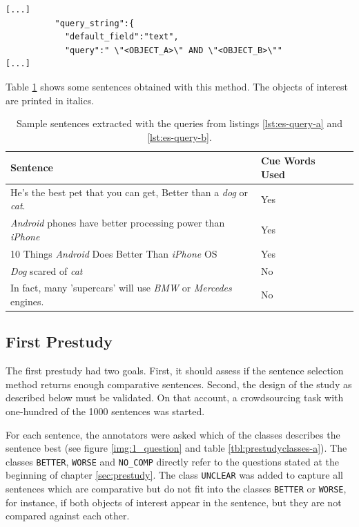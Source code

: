 \begin{lstlisting}[label=lst:es-query-b,breaklines=true,postbreak=\mbox{\textcolor{red}{$\hookrightarrow$}\space},caption=Second query for the prestudy (shortened). This query does not search for the cue words.]
[...]
          "query_string":{
            "default_field":"text",
            "query":" \"<OBJECT_A>\" AND \"<OBJECT_B>\""
[...]
\end{lstlisting}

Table \ref{tbl:example_sentences} shows some sentences obtained with this method. The objects of interest are printed in italics.

\begin{table}[h]
\centering
\caption{Sample sentences extracted with the queries from listings \ref{lst:es-query-a} and \ref{lst:es-query-b}.}
\label{tbl:example_sentences}
\begin{tabular}{@{}llr@{}}
\toprule
 Sentence   &  Cue Words Used                      \\ \midrule
 He's the best pet that you can get, Better than a \emph{dog} or \emph{cat}. & Yes \\
\emph{Android} phones have better processing power than \emph{iPhone} & Yes \\
 10 Things \emph{Android} Does Better Than \emph{iPhone} OS & Yes \\
 \emph{Dog} scared of \emph{cat} & No \\
 In fact, many 'supercars' will use \emph{BMW} or \emph{Mercedes} engines. & No \\

\bottomrule  
                               
\end{tabular}
\end{table}



\subsection{First Prestudy}
The first prestudy had two goals. First, it should assess if the sentence selection method returns enough comparative sentences. Second, the design of the study as described below must be validated. On that account, a crowdsourcing task with one-hundred of the 1000 sentences was started. 



For each sentence, the annotators were asked which of the classes describes the sentence best (see figure \ref{img:1_question} and table \ref{tbl:prestudyclasses-a}). The classes \texttt{BETTER}, \texttt{WORSE} and \texttt{NO\_COMP} directly refer to the questions stated at the beginning of chapter \ref{sec:prestudy}. The class \texttt{UNCLEAR} was added to capture all sentences which are comparative but do not fit into the classes \texttt{BETTER} or \texttt{WORSE}, for instance, if both objects of interest appear in the sentence, but they are not compared against each other.

